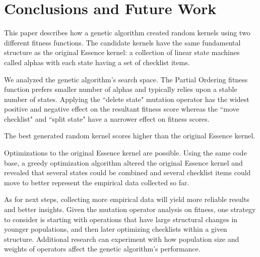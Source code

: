 \documentclass[preprint,12pt,3p]{elsarticle}
\begin{document}
\section{Conclusions and Future Work}

This paper describes how a genetic algorithm created random kernels using two different fitness functions. The candidate kernels have the same fundamental structure as the original Essence kernel: a collection of linear state machines called alphas with each state having a set of checklist items. 

We analyzed the genetic algorithm's search space. The Partial Ordering fitness function prefers smaller number of alphas and typically relies upon a stable number of states. Applying the ``delete state" mutation operator has the widest positive and negative effect on the resultant fitness score whereas the ``move checklist" and ``split state" have a narrower effect on fitness scores. 


The best generated random kernel scores higher than the original Essence kernel. 

Optimizations to the original Essence kernel are possible. Using the same code base, a greedy optimization algorithm altered the original Essence kernel and revealed that several states could be combined and several checklist items could move to better represent the empirical data collected so far.

As for next steps, collecting more empirical data will yield more reliable results and better insights. %
Given the mutation operator analysis on fitness, one strategy to consider is starting with operations that have large structural changes in younger populations, and then later optimizing checklists within a given structure. Additional research can experiment with how population size and weights of operators affect the genetic algorithm's performance. %
\end{document}

